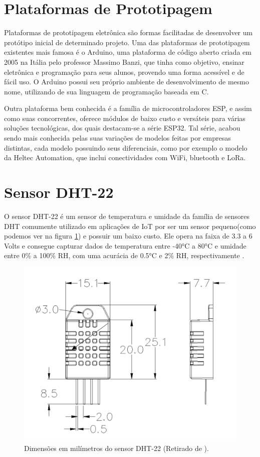 \section{Plataformas de Prototipagem}
\label{fund:plataforma-proto}
Plataformas de prototipagem eletrônica são formas facilitadas de desenvolver um protótipo inicial de determinado projeto. Uma das plataformas de prototipagem existentes mais famosa é o Arduino, uma plataforma de código aberto criada em 2005 na Itália pelo professor Massimo Banzi, que tinha como objetivo, ensinar eletrônica e programação para seus alunos, provendo uma forma acessível e de fácil uso. O Arduino possui seu próprio ambiente de desenvolvimento de mesmo nome, utilizando de sua linguagem de programação baseada em C.

Outra plataforma bem conhecida é a família de microcontroladores ESP, e assim como suas concorrentes, oferece módulos de baixo custo e versáteis para várias soluções tecnológicas, dos quais destacam-se a série ESP32. Tal série, acabou sendo mais conhecida pelas suas variações de modelos feitas por empresas distintas, cada modelo possuindo seus diferenciais, como por exemplo o modelo da Heltec Automation, que inclui conectividades com WiFi, bluetooth e LoRa.

\section{Sensor DHT-22}
\label{fund:dht-22}
O sensor DHT-22 é um sensor de temperatura e umidade da família de sensores DHT comumente utilizado em aplicações de IoT por ser um sensor pequeno(como podemos ver na figura \ref{fig:dht-22}) e possuir um baixo custo. Ele opera na faixa de 3.3 a 6 Volts e consegue capturar dados de temperatura entre -40°C a 80°C e umidade entre 0\% a 100\% RH, com uma acurácia de 0.5°C e 2\% RH, respectivamente \cite{datasheetDHT22}.

\begin{figure}[H]
  \centering
  \includegraphics[width=.80\textwidth]{assets/dht-22.png} 
  \caption{Dimensões em milímetros do sensor DHT-22 (Retirado de \cite{datasheetDHT22}).}
  \label{fig:dht-22} 
\end{figure}

